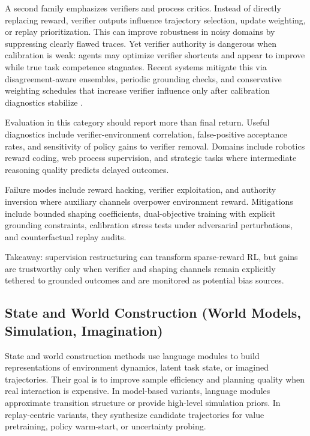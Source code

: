 \documentclass[pdflatex,sn-mathphys-num]{sn-jnl}
\begin{document}
A second family emphasizes verifiers and process critics. Instead of directly replacing reward, verifier outputs influence trajectory selection, update weighting, or replay prioritization. This can improve robustness in noisy domains by suppressing clearly flawed traces. Yet verifier authority is dangerous when calibration is weak: agents may optimize verifier shortcuts and appear to improve while true task competence stagnates. Recent systems mitigate this via disagreement-aware ensembles, periodic grounding checks, and conservative weighting schedules that increase verifier influence only after calibration diagnostics stabilize \cite{arxiv_p_2602_06493,arxiv_p_2602_12579,arxiv_p_2601_06845,arxiv_p_2602_02395,arxiv_p_2508_03680}.

Evaluation in this category should report more than final return. Useful diagnostics include verifier-environment correlation, false-positive acceptance rates, and sensitivity of policy gains to verifier removal. Domains include robotics reward coding, web process supervision, and strategic tasks where intermediate reasoning quality predicts delayed outcomes.

Failure modes include reward hacking, verifier exploitation, and authority inversion where auxiliary channels overpower environment reward. Mitigations include bounded shaping coefficients, dual-objective training with explicit grounding constraints, calibration stress tests under adversarial perturbations, and counterfactual replay audits.

Takeaway: supervision restructuring can transform sparse-reward RL, but gains are trustworthy only when verifier and shaping channels remain explicitly tethered to grounded outcomes and are monitored as potential bias sources.

\subsection{State and World Construction (World Models, Simulation, Imagination)}
State and world construction methods use language modules to build representations of environment dynamics, latent task state, or imagined trajectories. Their goal is to improve sample efficiency and planning quality when real interaction is expensive. In model-based variants, language modules approximate transition structure or provide high-level simulation priors. In replay-centric variants, they synthesize candidate trajectories for value pretraining, policy warm-start, or uncertainty probing.
\end{document}
